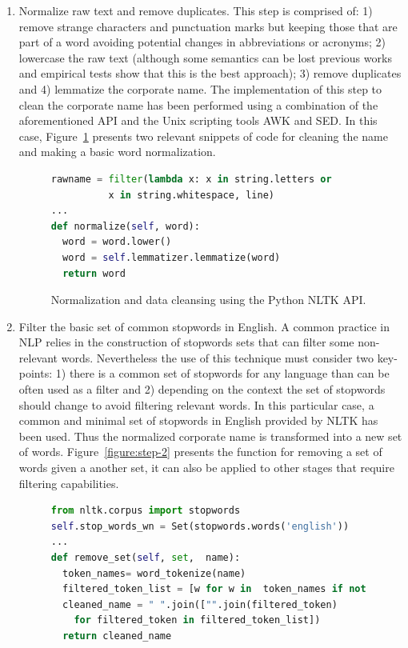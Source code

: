 \documentclass{llncs}
\begin{document}
\begin{enumerate}
 \item Normalize raw text and remove duplicates. This step is comprised of: 1) remove strange characters and punctuation marks but keeping 
 those that are part of a word avoiding potential changes in  abbreviations or acronyms; 2) lowercase the raw text (although some semantics can 
 be lost previous works and empirical tests show that this is the best approach); 3) remove duplicates and 4) lemmatize the corporate name. 
 The implementation of this step to clean the corporate name has been performed using a combination of the aforementioned API and 
 the Unix scripting tools AWK and SED. In this case, Figure~\ref{figure:step-1} presents 
 two relevant snippets of code for cleaning the name and making a basic word normalization. 
 
\begin{figure}[!h]
\begin{center}
\begin{lstlisting}[language=Python]        
rawname = filter(lambda x: x in string.letters or 
	      x in string.whitespace, line)
...
def normalize(self, word):
  word = word.lower()
  word = self.lemmatizer.lemmatize(word)
  return word
\end{lstlisting}
\caption{Normalization and data cleansing using the Python NLTK API.}
\label{figure:step-1}
\end{center}
\end{figure}


   

\item Filter the basic set of common stopwords in English. A common practice in NLP relies in the construction 
of stopwords sets that can filter some non-relevant words. Nevertheless the use of this technique must 
consider two key-points: 1) there is a common set of stopwords for any language than can be often used as a filter and 
2) depending on the context the set of stopwords should change to avoid filtering relevant words. In this particular 
case, a common and minimal set of stopwords in English provided by NLTK has been used. Thus the normalized corporate name is 
transformed into a new set of words. Figure~\ref{figure:step-2} presents the function for removing a set of 
words given a another set, it can also be applied to other stages that require filtering capabilities.

\begin{figure}[!h]
\begin{center}
\begin{lstlisting}[language=Python] 
from nltk.corpus import stopwords
self.stop_words_wn = Set(stopwords.words('english'))
...
def remove_set(self, set,  name): 
  token_names= word_tokenize(name)       
  filtered_token_list = [w for w in  token_names if not w in set ]
  cleaned_name = " ".join(["".join(filtered_token) 
    for filtered_token in filtered_token_list])
  return cleaned_name
  

\end{lstlisting}
\end{center}
\end{figure}
\end{enumerate}
\end{document}
